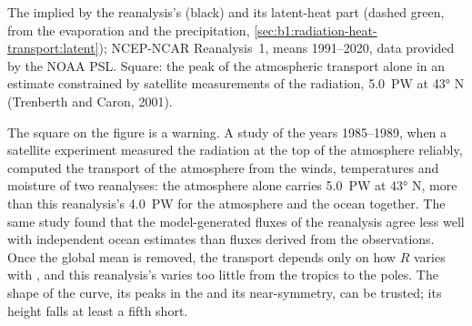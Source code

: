\begin{omfigure}

{\small The  implied by the reanalysis's 
(black) and its latent-heat part (dashed green, from the evaporation and the
precipitation, \cref{sec:b1:radiation-heat-transport:latent}); NCEP-NCAR
Reanalysis~1, means 1991--2020, data provided by the NOAA PSL. Square: the peak of
the atmospheric transport alone in an estimate constrained by satellite
measurements of the radiation, \qty{5.0}{PW} at \ang{43} N (Trenberth and Caron,
2001).}
\label{fig:b1:radiation-heat-transport:transport}
\end{omfigure}

The square on the figure is a warning. A study of the years 1985--1989, when a
satellite experiment measured the radiation at the top of the atmosphere reliably,
computed the transport of the atmosphere from the winds, temperatures and moisture
of two reanalyses: the atmosphere alone carries \qty{5.0}{PW} at \ang{43} N, more
than this reanalysis's \qty{4.0}{PW} for the atmosphere and the ocean together. The
same study found that the model-generated fluxes of the reanalysis agree less well
with independent ocean estimates than fluxes derived from the observations. Once
the global mean is removed, the transport depends only on how $R$ varies with
, and this reanalysis's  varies too little from the tropics to
the poles. The shape of the curve, its peaks in the  and its
near-symmetry, can be trusted; its height falls at least a fifth short.

